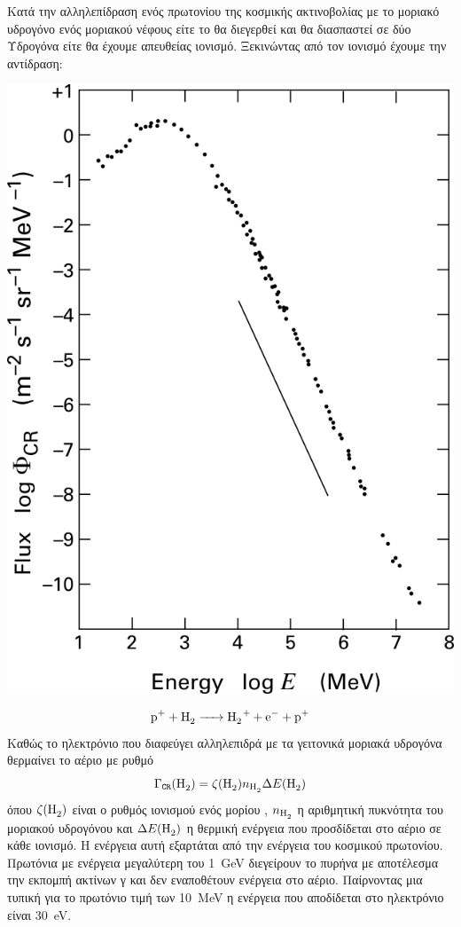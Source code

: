 Κατά την αλληλεπίδραση ενός πρωτονίου της κοσμικής ακτινοβολίας με το μοριακό υδρογόνο ενός μοριακού νέφους είτε το  θα διεγερθεί και θα διασπαστεί σε δύο Υδρογόνα είτε θα έχουμε απευθείας ιονισμό. Ξεκινώντας από τον ιονισμό έχουμε την αντίδραση:
\begin{marginfigure}
	\centering
	\includegraphics[width=1\linewidth]{Images/CRenergy}
	\caption{}
	\label{fig:crenergy}
\end{marginfigure}

\begin{equation}
\ce{p^+ +H2 -> H2 ^+ +e^- +p^+}
\end{equation}
Καθώς το ηλεκτρόνιο που διαφεύγει αλληλεπιδρά με τα γειτονικά μοριακά υδρογόνα θερμαίνει το αέριο με ρυθμό
\begin{equation}
\Gamma _\mathtt{CR} (\ce{H2}) =\zeta (\ce{H2})n_{\ce{H2}} \Delta E (\ce{H2})
\end{equation}
όπου $\zeta (\ce{H2})$ είναι ο ρυθμός ιονισμού ενός μορίου , $n_{\ce{H2}}$ η αριθμητική πυκνότητα του μοριακού υδρογόνου και $\Delta E (\ce{H2})$ η θερμική ενέργεια που προσδίδεται στο αέριο σε κάθε ιονισμό. Η ενέργεια αυτή εξαρτάται από την ενέργεια του κοσμικού πρωτονίου. Πρωτόνια με ενέργεια μεγαλύτερη του \SI{1}{GeV} διεγείρουν το πυρήνα με αποτέλεσμα την εκπομπή ακτίνων γ και δεν εναποθέτουν ενέργεια στο αέριο. Παίρνοντας μια τυπική για το πρωτόνιο τιμή των \SI{10}{MeV} η ενέργεια που αποδίδεται στο ηλεκτρόνιο είναι \SI{30}{eV}. 

